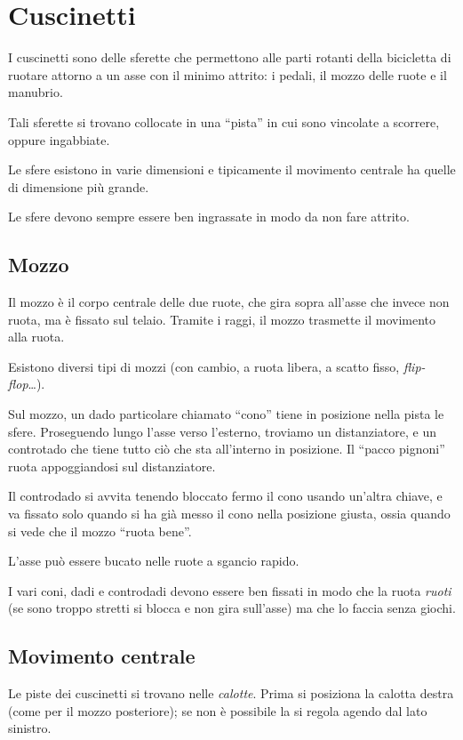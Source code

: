 \chapter{Cuscinetti}
I cuscinetti sono delle sferette che permettono alle parti rotanti della bicicletta di ruotare attorno a un asse con il minimo attrito: i pedali, il mozzo delle ruote e il manubrio.

Tali sferette si trovano collocate in una ``pista'' in cui sono vincolate a scorrere, oppure ingabbiate.

Le sfere esistono in varie dimensioni e tipicamente il movimento centrale ha quelle di dimensione più grande.

Le sfere devono sempre essere ben ingrassate in modo da non fare attrito.

\section{Mozzo}
Il mozzo è il corpo centrale delle due ruote, che gira sopra all'asse che invece non ruota, ma è fissato sul telaio.
Tramite i raggi, il mozzo trasmette il movimento alla ruota.

Esistono diversi tipi di mozzi (con cambio, a ruota libera, a scatto fisso, \emph{flip-flop}\ldots).

Sul mozzo, un dado particolare chiamato ``cono'' tiene in posizione nella pista le sfere.
Proseguendo lungo l'asse verso l'esterno, troviamo un distanziatore, e un controtado che tiene tutto ciò che sta all'interno in posizione.
Il ``pacco pignoni'' ruota appoggiandosi sul distanziatore.

Il controdado si avvita tenendo bloccato fermo il cono usando un'altra chiave, e va fissato solo quando si ha già messo il cono nella posizione giusta, ossia quando si vede che il mozzo ``ruota bene''.

L'asse può essere bucato nelle ruote a sgancio rapido.

I vari coni, dadi e controdadi devono essere ben fissati in modo che la ruota \emph{ruoti} (se sono troppo stretti si blocca e non gira sull'asse) ma che lo faccia senza giochi.

\section{Movimento centrale}
Le piste dei cuscinetti si trovano nelle \emph{calotte}.
Prima si posiziona la calotta destra (come per il mozzo posteriore); se non è possibile la si regola agendo dal lato sinistro.

